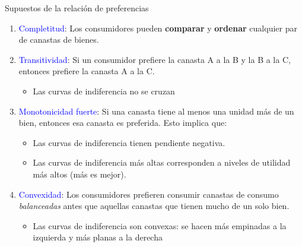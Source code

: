 \documentclass{beamer}
\begin{document}
\begin{frame}{Supuestos de la relación de preferencias}
    \begin{enumerate}
    \item \textcolor{blue}{Completitud}: Los consumidores pueden \textbf{comparar} y \textbf{ordenar} cualquier par de canastas de bienes.
    \item \textcolor{blue}{Transitividad}: Si un consumidor prefiere la canasta A a la B y la B a la C, entonces prefiere la canasta A a la C.
        \begin{itemize}
            \item Las curvas de indiferencia no se cruzan
        \end{itemize}
    \item \textcolor{blue}{Monotonicidad fuerte}: Si una canasta tiene al menos una unidad más de un bien, entonces esa canasta es preferida. Esto implica que:
        \begin{itemize}
            \item Las curvas de indiferencia tienen pendiente negativa. 
            \item Las curvas de indiferencia más altas corresponden a niveles de utilidad más altos (más es mejor).
        \end{itemize}
    
    \item \textcolor{blue}{Convexidad}: Los consumidores prefieren consumir canastas de consumo \textit{balanceadas} antes que aquellas canastas que tienen mucho de un solo bien.
        \begin{itemize}
            \item Las curvas de indiferencia son convexas: se hacen más empinadas a la izquierda y más planas a la derecha 
        \end{itemize}
    \end{enumerate} 
\end{frame}
\end{document}
